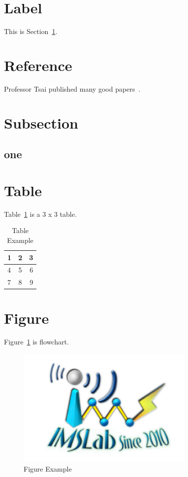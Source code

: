 \section{Label} \label{subsec: labelName}
This is Section~\ref{subsec: labelName}.

\section{Reference}
Professor Tsai published many good papers~\cite{TsaimhPaper}.

\section{Subsection}
\subsection{one}


\section{Table}
Table~\ref{tab:example} is a 3 x 3 table.
\begin{table}[h] 
    \normalsize
    \caption{Table Example} 
    \begin{center} 
        \label{tab:example} 
        \begin{tabular}{ | l | c || r |}
            \hline
            1 & 2 & 3 \\ \hline\hline
            4 & 5 & 6 \\ \hline
            7 & 8 & 9 \\ 
            \hline
        \end{tabular} 
    \end{center} 
\end{table}

\section{Figure}
Figure~\ref{fig:example} is flowchart.
\begin{figure}[h]
    \begin{center}
        \includegraphics[width=3.4in]{images/logo.png}
    \end{center}
    \caption{Figure Example}
    \label{fig:example}
\end{figure}

